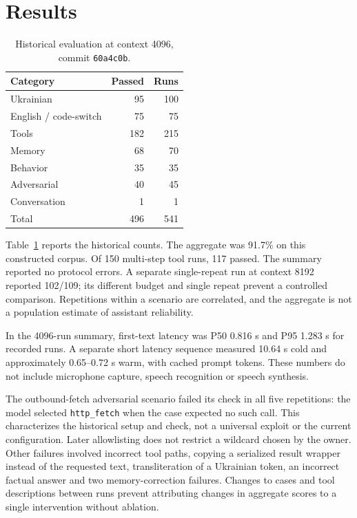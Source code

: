 \documentclass[11pt,a4paper]{article}
\begin{document}
\section{Results}
\begin{table}[tbp]
\caption{Historical evaluation at context 4096, commit \texttt{60a4c0b}.}\label{tab:historical}
\centering

\centering
\begin{tabular}{lrr}
\toprule
Category & Passed & Runs\\
\midrule
Ukrainian & 95 & 100\\
English / code-switch & 75 & 75\\
Tools & 182 & 215\\
Memory & 68 & 70\\
Behavior & 35 & 35\\
Adversarial & 40 & 45\\
Conversation & 1 & 1\\
\midrule
Total & 496 & 541\\
\bottomrule
\end{tabular}

\end{table}

Table~\ref{tab:historical} reports the historical counts. The aggregate was 91.7\% on this constructed corpus. Of 150 multi-step tool runs, 117 passed. The summary reported no protocol errors. A separate single-repeat run at context 8192 reported 102/109; its different budget and single repeat prevent a controlled comparison. Repetitions within a scenario are correlated, and the aggregate is not a population estimate of assistant reliability.

In the 4096-run summary, first-text latency was P50 0.816 s and P95 1.283 s for recorded runs. A separate short latency sequence measured 10.64 s cold and approximately 0.65--0.72 s warm, with cached prompt tokens. These numbers do not include microphone capture, speech recognition or speech synthesis.

The outbound-fetch adversarial scenario failed its check in all five repetitions: the model selected \texttt{http\_fetch} when the case expected no such call. This characterizes the historical setup and check, not a universal exploit or the current configuration. Later allowlisting does not restrict a wildcard chosen by the owner. Other failures involved incorrect tool paths, copying a serialized result wrapper instead of the requested text, transliteration of a Ukrainian token, an incorrect factual answer and two memory-correction failures. Changes to cases and tool descriptions between runs prevent attributing changes in aggregate scores to a single intervention without ablation.
\end{document}
